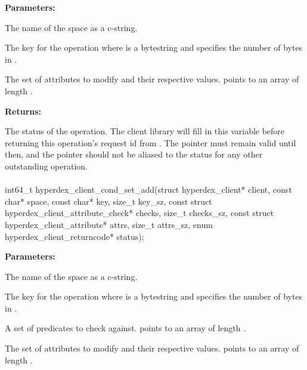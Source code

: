 \noindent\textbf{Parameters:}
\begin{description}[labelindent=\widthof{{\code{attrs}, \code{attrs\_sz}}},leftmargin=*,noitemsep,nolistsep,align=right]
\item[\code{space}] The name of the space as a c-string.
\item[\code{key}, \code{key\_sz}] The key for the operation where  is a bytestring and  specifies the number of bytes in .
\item[\code{attrs}, \code{attrs\_sz}] The set of attributes to modify and their respective values.   points to an array of length .
\end{description}

\noindent\textbf{Returns:}
\begin{description}[labelindent=\widthof{{\code{status}}},leftmargin=*,noitemsep,nolistsep,align=right]
\item[\code{status}] The status of the operation.  The client library will fill in this variable before returning this operation's request id from .  The pointer must remain valid until then, and the pointer should not be aliased to the status for any other outstanding operation.
\end{description}

\paragraph{}
\label{api:c:cond_set_add}
\begin{ccode}
int64_t hyperdex_client_cond_set_add(struct hyperdex_client* client,
        const char* space,
        const char* key, size_t key_sz,
        const struct hyperdex_client_attribute_check* checks, size_t checks_sz,
        const struct hyperdex_client_attribute* attrs, size_t attrs_sz,
        enum hyperdex_client_returncode* status);
\end{ccode}
\funcdesc 

\noindent\textbf{Parameters:}
\begin{description}[labelindent=\widthof{{\code{checks}, \code{checks\_sz}}},leftmargin=*,noitemsep,nolistsep,align=right]
\item[\code{space}] The name of the space as a c-string.
\item[\code{key}, \code{key\_sz}] The key for the operation where  is a bytestring and  specifies the number of bytes in .
\item[\code{checks}, \code{checks\_sz}] A set of predicates to check against.   points to an array of length .
\item[\code{attrs}, \code{attrs\_sz}] The set of attributes to modify and their respective values.   points to an array of length .
\end{description}

